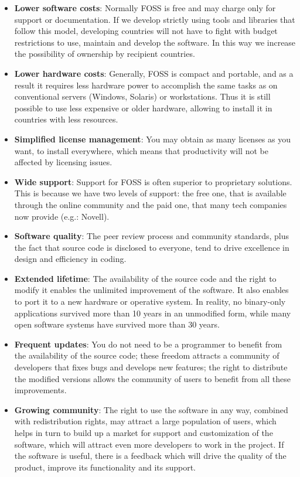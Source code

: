 \documentclass[11pt]{article} %
\begin{document}
\begin{itemize}
\item \textbf{Lower software costs}: Normally FOSS is free and may charge only for support or documentation. If we develop strictly using tools and libraries that follow this model, developing countries will not have to fight with budget restrictions to use, maintain and develop the software. In this way we increase the possibility of ownership by recipient countries.
\item \textbf{Lower hardware costs}: Generally, FOSS is compact and portable, and as a result it requires less hardware power to accomplish the same tasks as on conventional servers (Windows, Solaris) or workstations. Thus it is still possible to use less expensive or older hardware, allowing to install it in  countries with less resources.
\item \textbf{Simplified license management}: You may obtain as many licenses as you want, to install everywhere, which means that productivity will not be affected by licensing issues.
\item \textbf{Wide support}: Support for FOSS is often superior to proprietary solutions. This is because we have two levels of support: the free one, that is available through the online community and the paid one, that many tech companies now provide (e.g.: Novell).
\item \textbf{Software quality}: The peer review process and community standards, plus the fact that source code is disclosed to everyone, tend to drive excellence in design and efficiency in coding.
\item \textbf{Extended lifetime}: The availability of the source code and the right to modify it enables the unlimited improvement of the software. It also enables to port it to a new hardware or operative system. In reality, no binary-only applications survived more than 10 years in an unmodified form, while many open software systems have survived more than 30 years.
\item \textbf{Frequent updates}: You do not need to be a programmer to benefit from the availability of the source code; these freedom attracts a community of developers that fixes bugs and develops new features; the right to distribute the modified versions allows the community of users to benefit from all these improvements.
\item \textbf{Growing community}: The right to use the software in any way, combined with redistribution rights, may attract a large population of users, which helps in turn to build up a market for support and customization of the software, which will attract even more developers to work in the project. If the software is useful, there is a feedback which will drive the quality of the product, improve its functionality and its support.
\end{itemize}
\end{document}
